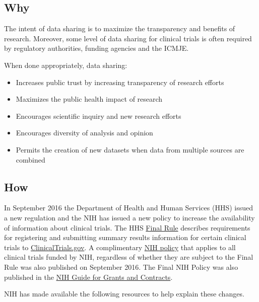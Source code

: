 \documentclass[]{book}
\providecommand{\tightlist}{%
  \setlength{\itemsep}{0pt}\setlength{\parskip}{0pt}}
\theoremstyle{definition}
\theoremstyle{definition}
\theoremstyle{definition}
\theoremstyle{remark}
\begin{document}
\subsection{Why}\label{why-21}

The intent of data sharing is to maximize the transparency and benefits
of research. Moreover, some level of data sharing for clinical trials is
often required by regulatory authorities, funding agencies and the
ICMJE.

When done appropriately, data sharing:

\begin{itemize}
\tightlist
\item
  Increases public trust by increasing transparency of research efforts
\item
  Maximizes the public health impact of research
\item
  Encourages scientific inquiry and new research efforts
\item
  Encourages diversity of analysis and opinion
\item
  Permits the creation of new datasets when data from multiple sources
  are combined
\end{itemize}

\subsection{How}\label{how-21}

In September 2016 the Department of Health and Human Services (HHS)
issued a new regulation and the NIH has issued a new policy to increase
the availability of information about clinical trials. The HHS
\href{https://www.federalregister.gov/documents/2016/09/21/2016-22129/clinical-trials-registration-and-results-information-submission}{Final
Rule} describes requirements for registering and submitting summary
results information for certain clinical trials to
\href{https://clinicaltrials.gov/}{ClinicalTrials.gov}. A complimentary
\href{https://www.federalregister.gov/documents/2016/09/21/2016-22379/dissemination-of-nih-funded-clinical-trial-information}{NIH
policy} that applies to all clinical trials funded by NIH, regardless of
whether they are subject to the Final Rule was also published on
September 2016. The Final NIH Policy was also published in the
\href{http://grants.nih.gov/grants/guide/notice-files/NOT-OD-16-149.html}{NIH
Guide for Grants and Contracts}.

NIH has made available the following resources to help explain these
changes.
\end{document}

